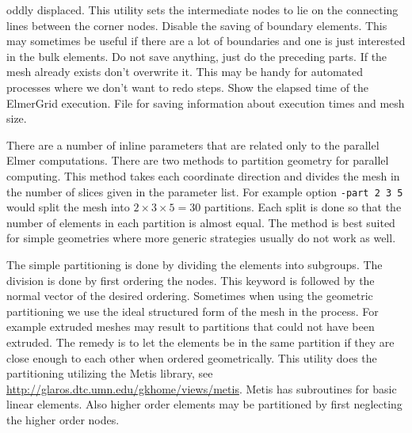 oddly displaced. This utility sets the intermediate nodes to lie on the connecting lines
between the corner nodes. 
%
Disable the saving of boundary elements.
This may sometimes be useful if there are a lot of boundaries and one is just interested 
in the bulk elements.
%
Do not save anything, just do the preceding parts.
%
If the mesh already exists don't overwrite it. This may be handy for automated
processes where we don't want to redo steps.
%
Show the elapsed time of the ElmerGrid execution.
%
File for saving information about execution times and mesh size.
\sifend
%

There are a number of inline parameters that are related only to the parallel Elmer computations.
%
\sifbegin
{} 
There are two methods to partition geometry for parallel computing. This
method takes each coordinate direction and divides the mesh in the number
of slices given in the parameter list. For example option
\texttt{-part 2 3 5} would split the mesh into $2\times 3 \times 5 = 30$ partitions. 
Each split is done so that the number of elements in each partition
is almost equal. The method is best suited for simple geometries 
where more generic strategies usually do not work as well.



%
The simple partitioning is done by dividing the elements
into subgroups. The division is done by first ordering the nodes. This
keyword is followed by the normal vector of the desired ordering.
%
Sometimes when using the geometric partitioning we use the ideal
structured form of the mesh in the process. For example extruded meshes
may result to partitions that could not have been extruded. The remedy
is to let the elements be in the same partition if they are close enough
to each other when ordered geometrically.
%
This utility does the partitioning utilizing the Metis library, see
\url{http://glaros.dtc.umn.edu/gkhome/views/metis}. Metis has subroutines
for basic linear elements. Also higher order elements may be partitioned
by first neglecting the higher order nodes.

